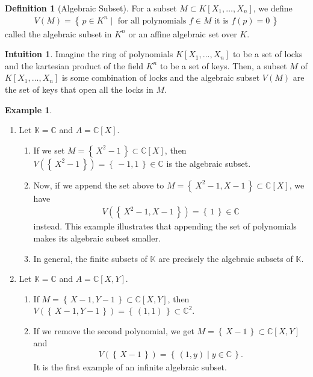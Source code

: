 \documentclass[a4paper]{book}
\theoremstyle{definition}
\newtheorem{definition}{Definition}[]
\newtheorem{example}{Example}[definition]
\newtheorem*{intuition}{Intuition}
\newcommand{\set}[1]{\left\{\, #1 \,\right\}}
\newcommand{\makeset}[2]{\left\{\, #1 \mid #2 \,\right\}}
\begin{document}
\begin{defbox}
    \begin{definition}[Algebraic Subset]
        For a subset \(M \subset K[X_1, \ldots, X_n]\), we define
        \begin{align*}
            V(M) = \makeset{p \in K^n}{\text{ for all polynomials }f \in M \text{ it is } f(p) = 0}
        \end{align*}
        called the algebraic subset in \(K^n\) or an affine algebraic set over \(K\).
    \end{definition}
\end{defbox}
\begin{intbox}
    \begin{intuition}
        Imagine the ring of polynomials \(K[X_1, \ldots, X_n]\) to be a set of locks and the kartesian product of the field \(K^n\) to be a set of keys. Then, a subset \(M\) of \(K[X_1, \ldots, X_n]\) is some combination of locks and the algebraic subset \(V(M)\) are the set of keys that open all the locks in \(M\).
    \end{intuition}
\end{intbox}
\begin{example}
    \begin{enumerate}
        \item Let \(\mathbb{K} = \mathbb{C}\) and \(A = \mathbb{C}[X]\).
        \begin{enumerate}
            \item If we set \(M = \set{X^2 - 1} \subset \mathbb{C}[X]\), then \(V(\set{X^2 - 1}) = \set{-1, 1} \in \mathbb{C}\) is the algebraic subset.
            \item Now, if we append the set above to \(M = \set{X^2 - 1, X - 1} \subset \mathbb{C}[X]\), we have \begin{align*}
                V(\set{X^2 - 1, X - 1}) = \set{1} \in \mathbb{C}
            \end{align*}
            instead. This example illustrates that appending the set of polynomials makes its algebraic subset smaller.
            \item In general, the finite subsets of \(\mathbb{K}\) are precisely the algebraic subsets of \(\mathbb{K}\).
        \end{enumerate}
        \item Let \(\mathbb{K} = \mathbb{C}\) and \(A = \mathbb{C}[X, Y]\).
        \begin{enumerate}
            \item If \(M = \set{X - 1, Y - 1} \subset \mathbb{C}[X, Y]\), then \(V(\set{X - 1, Y - 1}) = \set{(1, 1)} \subset \mathbb{C}^2\).
            \item If we remove the second polynomial, we get \(M = \set{X - 1} \subset \mathbb{C}[X, Y]\) and \begin{align*}
                V(\set{X - 1}) = \makeset{(1, y)}{y \in \mathbb{C}}\text{.}
            \end{align*}
            It is the first example of an infinite algebraic subset.
        \end{enumerate}
    \end{enumerate}
\end{example}
\end{document}
